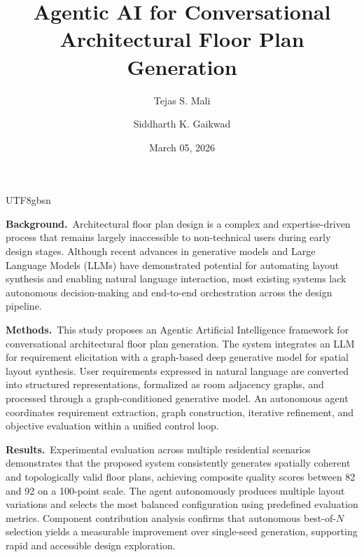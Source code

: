 \documentclass[11pt]{article}
\renewenvironment{abstract}
  {{\bfseries\noindent{\abstractname}\par\nobreak}\footnotesize}
  {\bigskip}
\begin{document}
\begin{CJK}{UTF8}{gbsn}

\title{Agentic AI for Conversational Architectural Floor Plan Generation}

\author[1]{Tejas S. Mali}
\author[1]{Siddharth K. Gaikwad}


\vspace{-1em}

\date{March 05, 2026}

\begingroup
\let\center\flushleft
\let\endcenter\endflushleft
\maketitle
\endgroup


\begin{abstract}

\textbf{Background.}~Architectural floor plan design is a complex and expertise-driven process that remains largely inaccessible to non-technical users during early design stages. Although recent advances in generative models and Large Language Models (LLMs) have demonstrated potential for automating layout synthesis and enabling natural language interaction, most existing systems lack autonomous decision-making and end-to-end orchestration across the design pipeline.

\textbf{Methods.}~This study proposes an Agentic Artificial Intelligence framework for conversational architectural floor plan generation. The system integrates an LLM for requirement elicitation with a graph-based deep generative model for spatial layout synthesis. User requirements expressed in natural language are converted into structured representations, formalized as room adjacency graphs, and processed through a graph-conditioned generative model. An autonomous agent coordinates requirement extraction, graph construction, iterative refinement, and objective evaluation within a unified control loop.

\textbf{Results.}~Experimental evaluation across multiple residential scenarios demonstrates that the proposed system consistently generates spatially coherent and topologically valid floor plans, achieving composite quality scores between 82 and 92 on a 100-point scale. The agent autonomously produces multiple layout variations and selects the most balanced configuration using predefined evaluation metrics. Component contribution analysis confirms that autonomous best-of-$N$ selection yields a measurable improvement over single-seed generation, supporting rapid and accessible design exploration.


\end{abstract}
\end{CJK}
\end{document}

